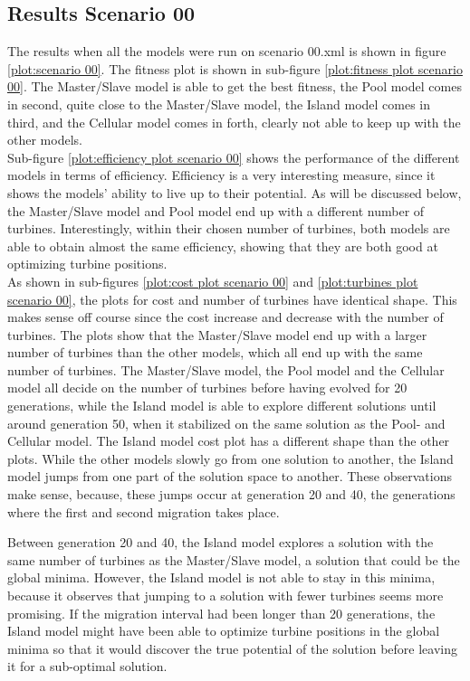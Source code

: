 \subsection{Results Scenario 00}
The results when all the models were run on scenario 00.xml is shown in figure \ref{plot:scenario 00}. The fitness plot is shown in sub-figure \ref{plot:fitness plot scenario 00}. The Master/Slave model is able to get the best fitness, the Pool model comes in second, quite close to the Master/Slave model, the Island model comes in third, and the Cellular model comes in forth, clearly not able to keep up with the other models.\\ 


\noindent Sub-figure \ref{plot:efficiency plot scenario 00} shows the performance of the different models in terms of efficiency. Efficiency is a very interesting measure, since it shows the models' ability to live up to their potential. As will be discussed below, the Master/Slave model and Pool model end up with a different number of turbines. Interestingly, within their chosen number of turbines, both models are able to obtain almost the same efficiency, showing that they are both good at optimizing turbine positions.\\


\noindent As shown in sub-figures \ref{plot:cost plot scenario 00} and \ref{plot:turbines plot scenario 00}, the plots for cost and number of turbines have identical shape. This makes sense off course since the cost increase and decrease with the number of turbines. The plots show that the Master/Slave model end up with a larger number of turbines than the other models, which all end up with the same number of turbines. The Master/Slave model, the Pool model and the Cellular model all decide on the number of turbines before having evolved for 20 generations, while the Island model is able to explore different solutions until around generation 50, when it stabilized on the same solution as the Pool- and Cellular model. The Island model cost plot has a different shape than the other plots. While the other models slowly go from one solution to another, the Island model jumps from one part of the solution space to another. These observations make sense, because, these jumps occur at generation 20 and 40, the generations where the first and second migration takes place. 

Between generation 20 and 40, the Island model explores a solution with the same number of turbines as the Master/Slave model, a solution that could be the global minima. However, the Island model is not able to stay in this minima, because it observes that jumping to a solution with fewer turbines seems more promising. If the migration interval had been longer than 20 generations, the Island model might have been able to optimize turbine positions in the global minima so that it would discover the true potential of the solution before leaving it for a sub-optimal solution.\\


